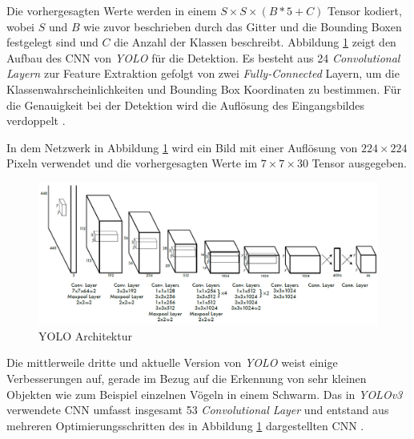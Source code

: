 Die vorhergesagten Werte werden in einem $S \times S \times (B * 5 + C)$ Tensor kodiert, wobei $S$ und $B$ wie zuvor beschrieben durch das Gitter und die Bounding Boxen festgelegt sind und $C$ die Anzahl der Klassen beschreibt. Abbildung \ref{yolo_architecture} zeigt den Aufbau des CNN von \textit{YOLO} für die Detektion. Es besteht aus 24 \textit{Convolutional Layern} zur Feature Extraktion gefolgt von zwei \textit{Fully-Connected} Layern, um die Klassenwahrscheinlichkeiten und Bounding Box Koordinaten zu bestimmen. Für die Genauigkeit bei der Detektion wird die Auflösung des Eingangsbildes verdoppelt \cite{JosephRedmon.2016}. 

In dem Netzwerk in Abbildung \ref{yolo_architecture} wird ein Bild mit einer Auflösung von $224 \times 224$ Pixeln verwendet und die vorhergesagten Werte im $7 \times 7 \times 30$ Tensor ausgegeben.

\begin{figure}[ht]
	\begin{center}
		\includegraphics[width=15cm]{Bilder/yolo_architecture.png} 
		\caption[YOLO Architektur]{YOLO Architektur \cite{JosephRedmon.2016}}
		\label{yolo_architecture}
	\end{center}
\end{figure}

Die mittlerweile dritte und aktuelle Version von \textit{YOLO} weist einige Verbesserungen auf, gerade im Bezug auf die Erkennung von sehr kleinen Objekten wie zum Beispiel einzelnen Vögeln in einem Schwarm. Das in \textit{YOLOv3} verwendete CNN umfasst insgesamt 53 \textit{Convolutional Layer} und entstand aus mehreren Optimierungsschritten des in Abbildung \ref{yolo_architecture} dargestellten CNN \cite{JosephRedmon.2018}. 






